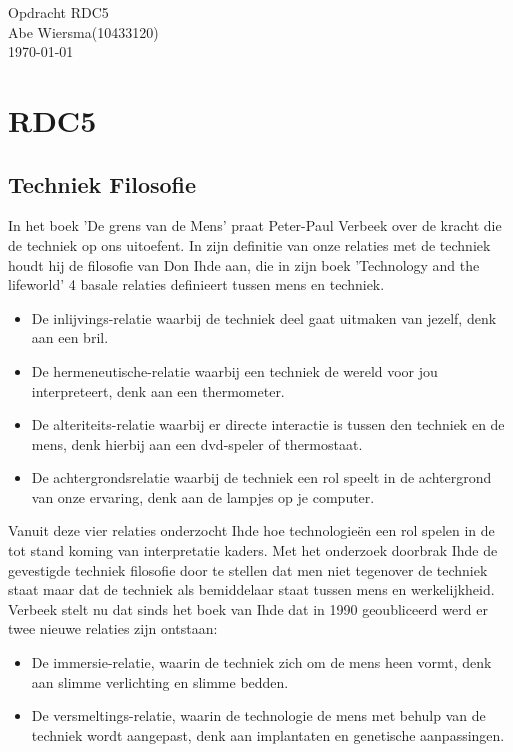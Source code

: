 \documentclass[pdftex,12pt,a4paper]{article}
\begin{document}

\noindent Opdracht RDC5\\ 
Abe Wiersma(10433120)\\
\today
\section*{RDC5}
\subsection{Techniek Filosofie}
In het boek 'De grens van de Mens' praat Peter-Paul Verbeek over de kracht die de techniek op ons uitoefent. In zijn definitie van onze relaties met de techniek houdt hij de filosofie van Don Ihde aan, die in zijn boek 'Technology and the lifeworld' 4 basale relaties definieert tussen mens en techniek.
\begin{itemize}
\item De inlijvings-relatie waarbij de techniek deel gaat uitmaken van jezelf, denk aan een bril. 
\item De hermeneutische-relatie waarbij een techniek de wereld voor jou interpreteert, denk aan een thermometer.
\item De alteriteits-relatie waarbij er directe interactie is tussen den techniek en de mens, denk hierbij aan een dvd-speler of thermostaat.
\item De achtergrondsrelatie waarbij de techniek een rol speelt in de achtergrond van onze ervaring, denk aan de lampjes op je computer.
\end{itemize}
Vanuit deze vier relaties onderzocht Ihde hoe technologieën een rol spelen in de tot stand koming van interpretatie kaders. Met het onderzoek doorbrak Ihde de gevestigde techniek filosofie door te stellen dat men niet tegenover de techniek staat maar dat de techniek als bemiddelaar staat tussen mens en werkelijkheid.
\\
Verbeek stelt nu dat sinds het boek van Ihde dat in 1990 geoubliceerd werd er twee nieuwe relaties zijn ontstaan:
\begin{itemize}
\item De immersie-relatie, waarin de techniek zich om de mens heen vormt, denk aan slimme verlichting en slimme bedden.
\item De versmeltings-relatie, waarin de technologie de mens met behulp van de techniek wordt aangepast, denk aan implantaten en genetische aanpassingen.
\end{itemize}
\end{document}
